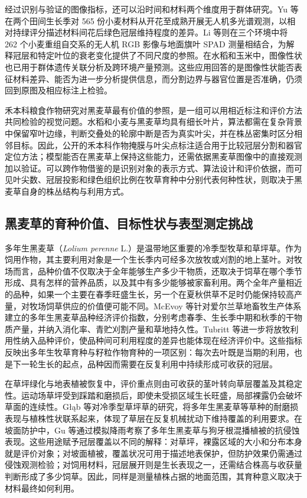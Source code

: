 经过识别与验证的图像指标，还可以沿时间和材料两个维度用于群体研究。Yu 等在两个田间生长季对 565 份小麦材料从开花至成熟开展无人机多光谱观测，以相对持绿评分描述材料间花后绿色冠层维持程度的差异。Li 等则在三个环境中将 262 个小麦重组自交系的无人机 RGB 影像与地面旗叶 SPAD 测量相结合，为解释冠层和特定叶位的衰老变化提供了不同尺度的参照。在水稻和玉米中，图像性状也已用于群体遗传关联分析及跨环境产量预测。这些应用回答的是图像性状能否表征材料差异、能否为进一步分析提供信息，而分割边界与器官位置是否准确，仍须回到原图及相应标注上检验。

禾本科粮食作物研究对黑麦草最有价值的参照，是一组可以用相近标注和评价方法共同检验的视觉问题。水稻和小麦与黑麦草均具有细长叶片，算法都需在复杂背景中保留窄叶边缘，判断交叠处的轮廓中断是否为真实叶尖，并在株丛密集时区分相邻目标。因此，公开的禾本科作物掩膜与叶尖点标注适合用于比较冠层分割和器官定位方法；模型能否在黑麦草上保持这些能力，还需依据黑麦草图像中的直接观测加以验证。可以跨作物借鉴的是识别对象的表示方式、算法设计和评价依据，而可见叶尖数、冠层投影和绿色组织比例在牧草育种中分别代表何种性状，则取决于黑麦草自身的株丛结构与利用方式。

\subsection{黑麦草的育种价值、目标性状与表型测定挑战}
\label{sec:ryegrass-breeding-traits}

多年生黑麦草（\textit{Lolium perenne} L.）是温带地区重要的冷季型牧草和草坪草。作为饲用作物，其主要利用对象是一个生长季内可经多次放牧或刈割的地上茎叶。对牧场而言，品种价值不仅取决于全年能够生产多少干物质，还取决于饲草在哪个季节形成、具有怎样的营养品质，以及其中有多少能够被家畜利用。两个全年产量相近的品种，如果一个主要在春季旺盛生长，另一个在夏秋供草不足时仍能保持较高产量，对牧场饲草供应的价值便可能不同。McEvoy 等针对爱尔兰草地畜牧生产体系建立的多年生黑麦草品种经济评价指数，分别考虑春季、生长季中期和秋季的干物质产量，并纳入消化率、青贮刈割产量和草地持久性。Tubritt 等进一步将放牧利用性纳入品种评价，使品种间可利用程度的差异也能体现在经济评价中。这些指标反映出多年生牧草育种与籽粒作物育种的一项区别：每次去叶既是当期的利用，也是下一轮生长的起点，品种因而需要在反复利用中持续形成可收获的冠层。

在草坪绿化与地表植被恢复中，评价重点则由可收获的茎叶转向草层覆盖及其稳定性。运动场草坪受到踩踏和磨损后，即使未受损区域生长旺盛，局部裸露仍会破坏草面的连续性。Głąb 等对冷季型草坪草的研究，将多年生黑麦草等草种的耐磨损表现与植株性状联系起来，体现了草层在反复机械扰动下维持覆盖的利用要求。在坡面防护中，Gu 等通过模拟降雨考察了多年生黑麦草与狗牙根混播植被的抗侵蚀表现。这些用途赋予冠层覆盖以不同的解释：对草坪，裸露区域的大小和分布本身就是评价对象；对坡面植被，覆盖状况可用于描述地表保护，但防护效果仍需通过侵蚀观测检验；对饲用材料，冠层展开则是生长表现之一，还需结合株高与收获量判断形成了多少饲草。因此，同样是测量植株占据的地面范围，其育种意义取决于材料最终如何利用。

